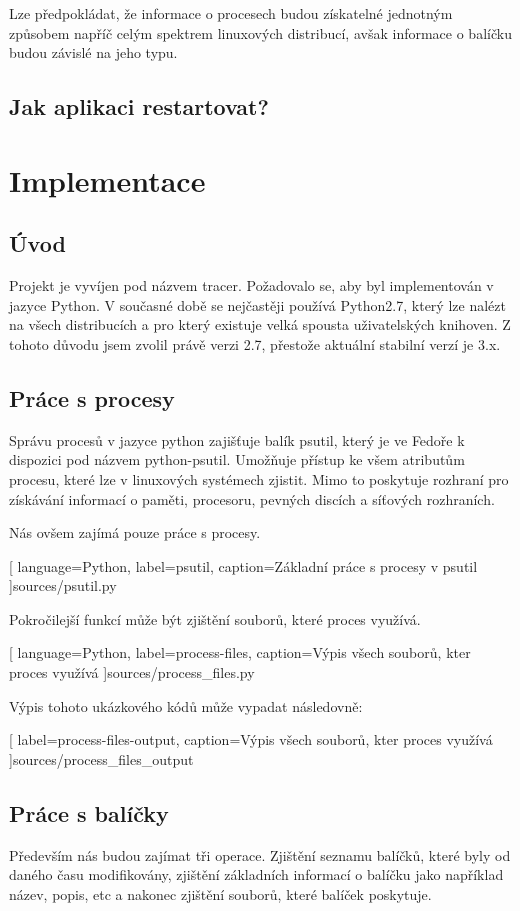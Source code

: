 \documentclass[10pt,a4paper]{article}
\begin{document}
		Lze předpokládat, že informace o procesech budou získatelné jednotným způsobem napříč celým spektrem linuxových distribucí, avšak informace o balíčku budou závislé na jeho typu.

		\subsection{Jak aplikaci restartovat?}

	\section{Implementace}
		\subsection{Úvod}
		Projekt je vyvíjen pod názvem tracer. Požadovalo se, aby byl implementován v jazyce Python. V současné době se nejčastěji používá Python2.7, který lze nalézt na všech distribucích a pro který existuje velká spousta uživatelských knihoven. Z tohoto důvodu jsem zvolil právě verzi 2.7, přestože aktuální stabilní verzí je 3.x.

		\subsection{Práce s procesy}
		Správu procesů v jazyce python zajišťuje balík psutil, který je ve Fedoře k dispozici pod názvem python-psutil. Umožňuje přístup ke všem atributům procesu, které lze v linuxových systémech zjistit. Mimo to poskytuje rozhraní pro získávání informací o paměti, procesoru, pevných discích a síťových rozhraních.

		Nás ovšem zajímá pouze práce s procesy.

		
		[
			language={Python},
			label=psutil,
			caption={Základní práce s procesy v psutil}
		]{sources/psutil.py}

		Pokročilejší funkcí může být zjištění souborů, které proces využívá.

		
		[
			language={Python},
			label=process-files,
			caption={Výpis všech souborů, kter proces využívá}
		]{sources/process_files.py}

		Výpis tohoto ukázkového kódů může vypadat následovně:

		
		[
			label=process-files-output,
			caption={Výpis všech souborů, kter proces využívá}
		]{sources/process_files_output}

		\subsection{Práce s balíčky}
			Především nás budou zajímat tři operace. Zjištění seznamu balíčků, které byly od daného času modifikovány, zjištění základních informací o balíčku jako například název, popis, etc a nakonec zjištění souborů, které balíček poskytuje.
\end{document}
